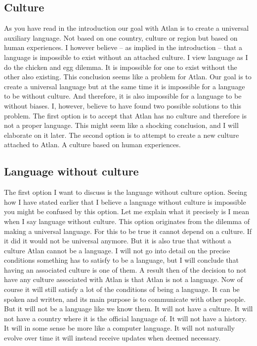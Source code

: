 \vspace{-.3cm}
\subsection{Culture}

\noindent As you have read in the introduction our goal with Atlan is to create a universal auxiliary language. Not based on one country, culture or region but based on human experiences. I however believe – as implied in the introduction – that a language is impossible to exist without an attached culture. I view language as I do the chicken and egg dilemma. It is impossible for one to exist without the other also existing. This conclusion seems like a problem for Atlan. Our goal is to create a universal language but at the same time it is impossible for a language to be without culture. And therefore, it is also impossible for a language to be without biases. I, however, believe to have found two possible solutions to this problem. The first option is to accept that Atlan has no culture and therefore is not a proper language. This might seem like a shocking conclusion, and I will elaborate on it later. The second option is to attempt to create a new culture attached to Atlan. A culture based on human experiences.  

\subsection{Language without culture} 

\noindent The first option I want to discuss is the language without culture option. Seeing how I have stated earlier that I believe a language without culture is impossible you might be confused by this option. Let me explain what it precisely is I mean when I say language without culture. This option originates from the dilemma of making a universal language. For this to be true it cannot depend on a culture. If it did it would not be universal anymore. But it is also true that without a culture Atlan cannot be a language. I will not go into detail on the precise conditions something has to satisfy to be a language, but I will conclude that having an associated culture is one of them. A result then of the decision to not have any culture associated with Atlan is that Atlan is not a language. Now of course it will still satisfy a lot of the conditions of being a language. It can be spoken and written, and its main purpose is to communicate with other people. But it will not be a language like we know them. It will not have a culture. It will not have a country where it is the official language of. It will not have a history. It will in some sense be more like a computer language. It will not naturally evolve over time it will instead receive updates when deemed necessary.  

